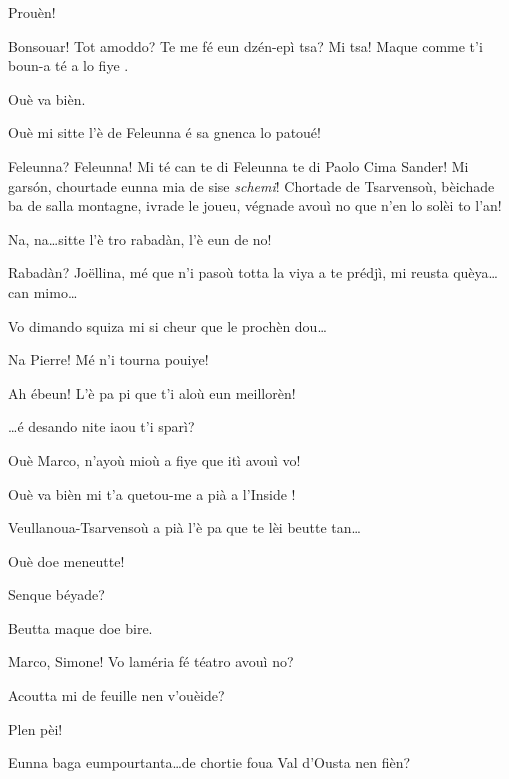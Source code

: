 \begin{drama}
\Joelspeaks Prouèn!


\Cimaspeaks {} Bonsouar! Tot amoddo? Te me fé eun dzén-epì tsa? Mi tsa! Maque comme t'i boun-a té a lo fiye \malisieu .

\Serventaspeaks Ouè va bièn.

\Francescaspeaks  Ouè mi sitte l'è de Feleunna é sa gnenca lo patoué!

\Cimaspeaks Feleunna? Feleunna! Mi té can te di Feleunna te di Paolo Cima Sander! Mi gars\'on, chourtade eunna mia de sise \textit{schemi}! Chortade de Tsarvensoù, bèichade ba de salla montagne, ivrade le joueu, végnade avouì no que n’en lo solèi to l’an!

\Joellespeaks{} Na, na\ldots sitte l'è tro rabadàn, l'è eun de no!

\Cimaspeaks Rabadàn? Jo\"{e}llina, mé que n'i pasoù totta la viya a te prédjì, mi reusta quèya\ldots can mimo\ldots

\Pierrespeaks{} Vo dimando squiza mi si cheur que le prochèn dou\ldots

\Joelspeaks Na Pierre! Mé n'i tourna  pouiye!


\Joelspeaks{} Ah ébeun! L'è pa pi que t'i aloù eun meillorèn!

\Marcospeaks{} \ldots é desando nite iaou t'i sparì?

\Simonespeaks Ouè Marco, n’ayoù mioù a fiye que itì avouì vo!

\Marcospeaks  Ouè va bièn mi t'a quetou-me a pià a l’Inside \malecha !

\Simonespeaks Veullanoua-Tsarvensoù a pià l'è pa que te lèi beutte tan\ldots

\Marcospeaks Ouè doe meneutte!

\Serventaspeaks Senque béyade?

\Simonespeaks Beutta maque doe bire.

\Pierrespeaks{} Marco, Simone! Vo laméria fé téatro avouì no?

\Marcospeaks Acoutta mi de feuille nen v'ouèide?

\Joelspeaks Plen pèi!

\Simonespeaks Eunna baga eumpourtanta\ldots de chortie foua Val d'Ousta nen fièn?


\end{drama}
